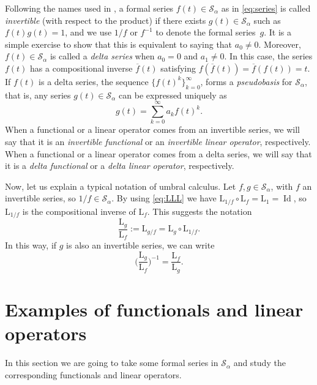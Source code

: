 \documentclass[11pt]{article}
\theoremstyle{plain}
\theoremstyle{remark}
\numberwithin{equation}{section} %
\newcommand{\Sa}{\mathcal{S}_{\alpha}}
\newcommand{\LL}{\mathrm{L}}
\begin{document}

Following the names used in \cite[Chapter~1, \S\,2]{Rom}, a formal series $f(t) \in \Sa$ as in \eqref{eq:series} is called \textit{invertible} (with respect to the product) if there exists $g(t) \in \Sa$ such as $f(t)g(t) = 1$, and we use $1/f$ or $f^{-1}$ to denote the formal series~$g$. It is a simple exercise to show that this is equivalent to saying that $a_0\ne 0$. Moreover, $f(t) \in \Sa$ is called a \textit{delta series} when $a_0 = 0$ and $a_1\ne 0$. In this case, the series $f(t)$ has a compositional inverse $\overline{f}(t)$ satisfying $f(\overline{f}(t)) = \overline{f}(f(t)) = t$. If $f(t)$ is a delta series, the sequence $\{f(t)^k\}_{k=0}^{\infty}$, forms a \textit{pseudobasis} for $\Sa$, that is, any series $g(t) \in \Sa$ can be expressed uniquely as
\[
g(t) = \sum_{k=0}^{\infty} a_k f(t)^k.
\]
When a functional or a linear operator comes from an invertible series, we will say that it is an \textit{invertible functional} or an \textit{invertible linear operator}, respectively. When a functional or a linear operator comes from a delta series, we will say that it is a \textit{delta functional} or a \textit{delta linear operator}, respectively.

Now, let us explain a typical notation of umbral calculus. Let $f, g \in \Sa$, with $f$ an invertible series, so $1/f \in \Sa$. By using \eqref{eq:LLL} we have $\LL_{1/f} \circ \LL_{f} = \LL_{1} = \operatorname{Id}$, so $\LL_{1/f}$ is the compositional inverse of $\LL_{f}$. This suggests the notation
\begin{equation}
\label{eq:fracLgLf}
  \frac{\LL_{g}}{\LL_{f}} := \LL_{g/f} = \LL_{g} \circ \LL_{1/f}.
\end{equation}
In this way, if $g$ is also an invertible series, we can write
\begin{equation}
\label{eq:invcLgLf}
  \bigg(\frac{\LL_{g}}{\LL_{f}}\bigg)^{-1} = \frac{\LL_{f}}{\LL_{g}}.
\end{equation}

\section{Examples of functionals and linear operators}
\label{sec:ex-fun-lin}

In this section we are going to take some formal series in $\Sa$ and study the corresponding functionals and linear operators.
\end{document}

